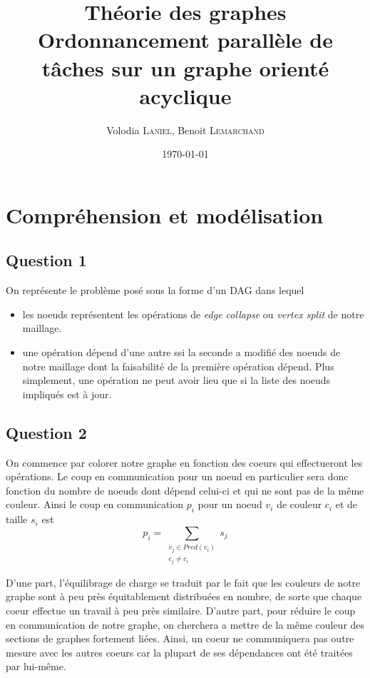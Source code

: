 \documentclass[11pt]{article}
\title{Théorie des graphes\\
Ordonnancement parallèle de tâches sur un graphe orienté acyclique}
\author{Volodia \textsc{Laniel}, Benoit \textsc{Lemarchand}}
\date{\today}
\begin{document}
\begin{titlepage}
  \maketitle
  \vfill
  \tableofcontents
\end{titlepage}

\section{Compréhension et modélisation}
  \subsection{Question 1}
    On représente le problème posé sous la forme d'un DAG dans lequel
    \begin{itemize}
      \item les noeuds représentent les opérations de \emph{edge collapse} ou
        \emph{vertex split} de notre maillage.
      \item une opération dépend d'une autre ssi la seconde a modifié des noeuds
        de notre maillage dont la faisabilité de la première opération dépend.
        Plus simplement, une opération ne peut avoir lieu que si la liste des
        noeuds impliqués est à jour.
    \end{itemize}

  \subsection{Question 2}
    On commence par colorer notre graphe en fonction des coeurs qui effectueront
    les opérations. Le coup en communication pour un noeud en particulier sera
    donc fonction du nombre de noeuds dont dépend celui-ci et qui ne sont pas
    de la même couleur. Ainsi le coup en communication $p_i$ pour un noeud $v_i$
    de couleur $c_i$ et de taille $s_i$ est
    \[ p_i = \sum_{\substack{v_j \in Pred(v_i) \\ c_j \neq c_i}}{s_j} \]

    D'une part, l'équilibrage de charge se traduit par le fait que les couleurs
    de notre graphe sont à peu près équitablement distribuées en nombre, de
    sorte que chaque coeur effectue un travail à peu près similaire. D'autre
    part, pour réduire le coup en communication de notre graphe, on cherchera a
    mettre de la même couleur des sections de graphes fortement liées. Ainsi, un
    coeur ne communiquera pas outre mesure avec les autres coeurs car la plupart
    de ses dépendances ont été traitées par lui-même.
\end{document}
